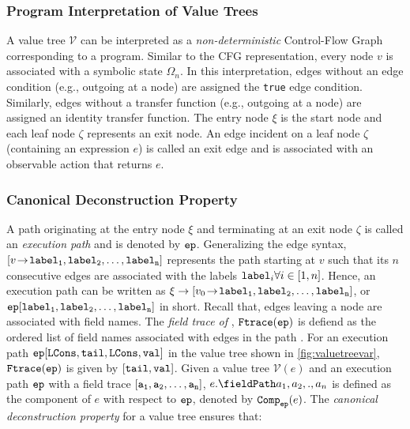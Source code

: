 \subsubsection{Program Interpretation of Value Trees}
\label{sec:valuetreeasprog}
A value tree $\mathcal{V}$ can be interpreted as a {\em non-deterministic} Control-Flow Graph corresponding to a program.
Similar to the CFG representation, every node $v$ is associated with a symbolic state $\Omega_n$.
In this interpretation, edges without an edge condition (e.g., outgoing at a \prodn{} node) are assigned the {\tt true}
edge condition. Similarly, edges without a transfer function (e.g., outgoing at a \sumn{} node) are assigned an
identity transfer function.
The entry node $\xi$ is the start node and each leaf node $\zeta$ represents an exit node.
An edge incident on a leaf node $\zeta$ (containing an expression $e$) is called an exit edge and is associated
with an observable action that returns $e$.



\subsubsection{Canonical Deconstruction Property}
\label{sec:valuetreecanonicaldecons}
A path originating at the entry node $\xi$ and terminating at an exit node $\zeta$ is called an
{\em execution path} and is denoted by ${\tt ep}{}$.
Generalizing the edge syntax, ${[v \! \rightarrow \! {\tt label_1,label_2,\dots ,label_n}]}$ represents the path
starting at $v$ such that its $n$ consecutive edges are associated with the labels ${\tt label}_i \forall i \in [1,n]$.
Hence, an execution path \execpath{} can be written as $\xi \rightarrow {\ensuremath{[v_0 \! \rightarrow \! {\tt label_1,label_2,\dots ,label_n}]}}$,
or ${\tt ep}{}[{\tt label_1,label_2,\dots,label_n}]$ in short.
Recall that, edges leaving a \prodn{} node are associated with field names.
The {\em field trace of \execpath{}}, ${{\tt Ftrace}({\tt ep}{})}$ is defiend as the ordered list of field names associated with edges in the path \execpath{}.
For an execution path ${\tt ep}{}[{\tt LCons},{{\tt tail}},{\tt LCons},{{\tt val}}]$ in the value tree shown in \cref{fig:valuetreevar},
${{\tt Ftrace}({\tt ep}{})}$ is given by $[{{\tt tail}},{{\tt val}}]$.
Given a value tree $\mathcal{V}(e)$ and an execution path ${\tt ep}{}$ with a field trace $[{\tt a_1,a_2,\dots,a_n}]$,
$\prodAccess{e}{a_1,a_2,.,a_n}$ is defined as the component of $e$ with respect to ${\tt ep}{}$, denoted by ${{\tt Comp}_{{\tt ep}{}}(e)}$.
The {\em canonical deconstruction property} for a value tree ensures that:

